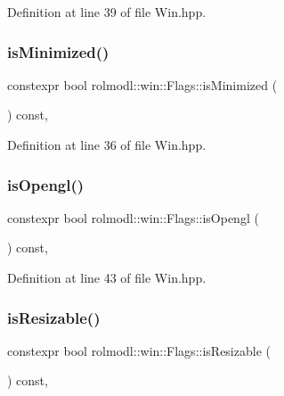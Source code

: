 Definition at line 39 of file Win.\+hpp.

\mbox{\label{structrolmodl_1_1win_1_1_flags_a07a1f5140f642a20af1d591bdd8fbde6}} 
\subsubsection{\texorpdfstring{isMinimized()}{isMinimized()}}
{\footnotesize\ttfamily constexpr bool rolmodl\+::win\+::\+Flags\+::is\+Minimized (\begin{DoxyParamCaption}{ }\end{DoxyParamCaption}) const\hspace{0.3cm}{\ttfamily [inline]}, {\ttfamily [noexcept]}}



Definition at line 36 of file Win.\+hpp.

\mbox{\label{structrolmodl_1_1win_1_1_flags_a58ad4049cd9baf3340cab0d84d1397a9}} 
\subsubsection{\texorpdfstring{isOpengl()}{isOpengl()}}
{\footnotesize\ttfamily constexpr bool rolmodl\+::win\+::\+Flags\+::is\+Opengl (\begin{DoxyParamCaption}{ }\end{DoxyParamCaption}) const\hspace{0.3cm}{\ttfamily [inline]}, {\ttfamily [noexcept]}}



Definition at line 43 of file Win.\+hpp.

\mbox{\label{structrolmodl_1_1win_1_1_flags_a84d7a900fc3170f2605d7d49c2e5e79e}} 
\subsubsection{\texorpdfstring{isResizable()}{isResizable()}}
{\footnotesize\ttfamily constexpr bool rolmodl\+::win\+::\+Flags\+::is\+Resizable (\begin{DoxyParamCaption}{ }\end{DoxyParamCaption}) const\hspace{0.3cm}{\ttfamily [inline]}, {\ttfamily [noexcept]}}



